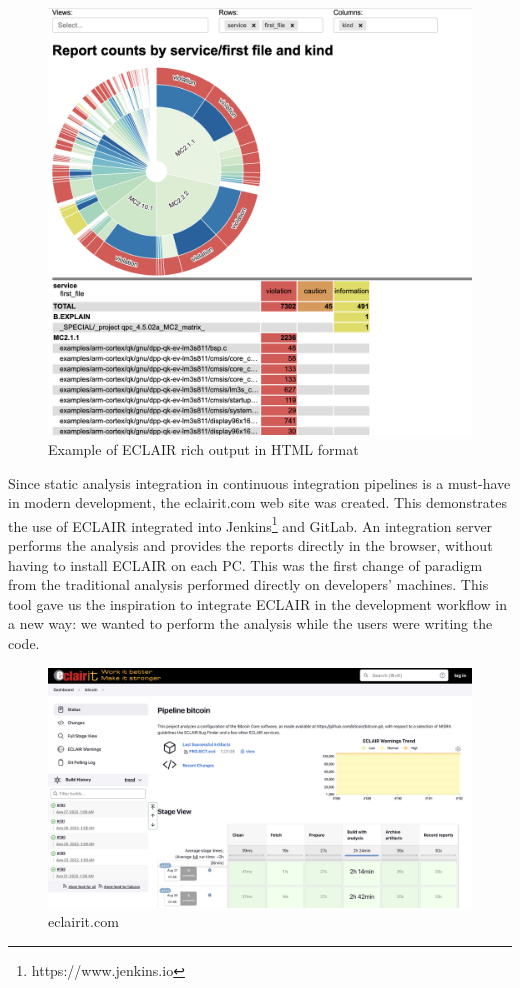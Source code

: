 \begin{figure}[ht]
	\centering
	\includegraphics[width=1\textwidth]{Immagini/eclair_rich_output_html.jpg}
	\caption{Example of ECLAIR rich output in HTML format}
	\label{fig:one}
\end{figure}

Since static analysis integration in continuous integration pipelines is a must-have in modern development, the eclairit.com web site was created. This demonstrates the use of ECLAIR integrated into Jenkins\footnote{https://www.jenkins.io} and GitLab. An integration server performs the analysis and provides the reports directly in the browser, without having to install ECLAIR on each PC. This was the first change of paradigm from the traditional analysis performed directly on developers' machines.
This tool gave us the inspiration to integrate ECLAIR in the development workflow in a new way: we wanted to perform the analysis while the users were writing the code.

\begin{figure}[ht]
	\centering
	\includegraphics[width=1\textwidth]{Immagini/eclairit.jpg}
	\caption{eclairit.com}
	\label{fig:one}
\end{figure}